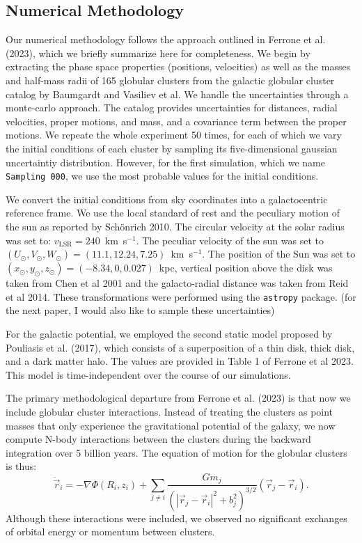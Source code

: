 \documentclass[draft]{aa}
\begin{document}
  \subsection{Numerical Methodology}
    Our numerical methodology follows the approach outlined in Ferrone et al. (2023), which we briefly summarize here for completeness. We begin by extracting the phase space properties (positions, velocities) as well as the masses and half-mass radii of 165 globular clusters from the galactic globular cluster catalog by Baumgardt and Vasiliev et al. We handle the uncertainties through a monte-carlo approach. The catalog provides uncertainties for distances, radial velocities, proper motions, and mass, and a covariance term between the proper motions. We repeate the whole experiment 50 times, for each of which we vary the initial conditions of each cluster by sampling its five-dimensional gaussian uncertaintiy distribution. However, for the first simulation, which we name \texttt{Sampling 000}, we use the most probable values for the initial conditions. 

    We convert the initial conditions from sky coordinates into a galactocentric reference frame. We use the local standard of rest and the peculiary motion of the sun as reported by Sch\"onrich 2010. The circular velocity at the solar radius was set to: $v_{\text{LSR}} = 240$~km~s$^{-1}$. The peculiar velocity of the sun was set to $(U_\odot, V_\odot, W_\odot)=(11.1, 12.24, 7.25)$~km~s$^{-1}$. The position of the Sun was set to $(x_\odot,y_\odot,z_\odot) = (-8.34,0,0.027)$~kpc, vertical position above the disk was taken from Chen et al 2001 and the galacto-radial distance was taken from Reid et al 2014. These transformations were performed using the \texttt{astropy} package. (for the next paper, I would also like to sample these uncertainties)

    For the galactic potential, we employed the second static model proposed by Pouliasis et al. (2017), which consists of a superposition of a thin disk, thick disk, and a dark matter halo. The values are provided in Table 1 of Ferrone et al 2023. This model is time-independent over the course of our simulations. 

    The primary methodological departure from Ferrone et al. (2023) is that now we include globular cluster interactions. Instead of treating the clusters as point masses that only experience the gravitational potential of the galaxy, we now compute N-body interactions between the clusters during the backward integration over 5 billion years. The equation of motion for the globular clusters is thus: 
    \begin{equation}
      \ddot{\vec{r}}_i = -\nabla \Phi(R_i,z_i) + \left.\sum_{j\neq i} \frac{Gm_j}{\left(|\vec{r}_j - \vec{r}_i|^2 + b_j^2\right)^{3/2}}\right. \left(\vec{r}_j - \vec{r}_i\right).
      \end{equation}\label{eq:GCNBody}
    Although these interactions were included, we observed no significant exchanges of orbital energy or momentum between clusters. 
\end{document}
